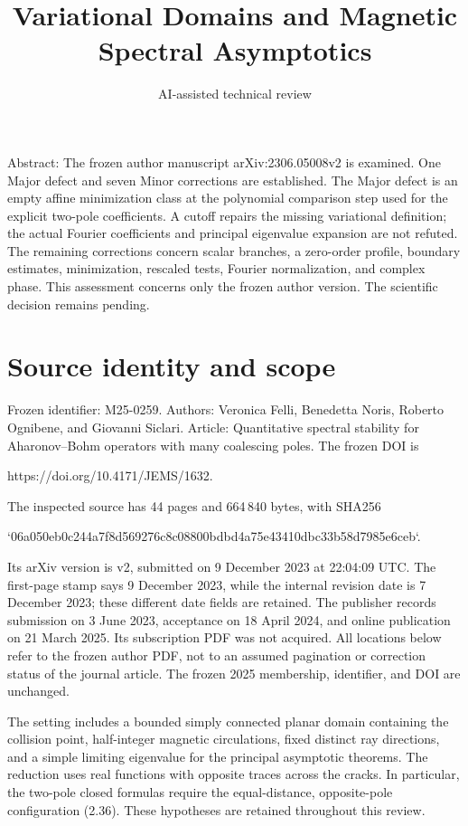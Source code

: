 \documentclass[10pt]{article}
\title{Variational Domains and Magnetic Spectral Asymptotics}
\author{AI-assisted technical review}
\date{}
\begin{document}
\maketitle
Abstract: The frozen author manuscript arXiv:2306.05008v2 is examined. One Major defect and seven Minor corrections are established. The Major defect is an empty affine minimization class at the polynomial comparison step used for the explicit two-pole coefficients. A cutoff repairs the missing variational definition; the actual Fourier coefficients and principal eigenvalue expansion are not refuted. The remaining corrections concern scalar branches, a zero-order profile, boundary estimates, minimization, rescaled tests, Fourier normalization, and complex phase. This assessment concerns only the frozen author version. The scientific decision remains pending.\par
\section*{Source identity and scope}
Frozen identifier: M25-0259. Authors: Veronica Felli, Benedetta Noris, Roberto Ognibene, and Giovanni Siclari. Article: Quantitative spectral stability for Aharonov–Bohm operators with many coalescing poles. The frozen DOI is\par
https://doi.org/10.4171/JEMS/1632.\par
The inspected source has 44 pages and 664 840 bytes, with SHA256\par
`06a050eb0c244a7f8d569276c8c08800bdbd4a75e43410dbc33b58d7985e6ceb`.\par
Its arXiv version is v2, submitted on 9 December 2023 at 22:04:09 UTC. The first-page stamp says 9 December 2023, while the internal revision date is 7 December 2023; these different date fields are retained. The publisher records submission on 3 June 2023, acceptance on 18 April 2024, and online publication on 21 March 2025. Its subscription PDF was not acquired. All locations below refer to the frozen author PDF, not to an assumed pagination or correction status of the journal article. The frozen 2025 membership, identifier, and DOI are unchanged.\par
The setting includes a bounded simply connected planar domain containing the collision point, half-integer magnetic circulations, fixed distinct ray directions, and a simple limiting eigenvalue for the principal asymptotic theorems. The reduction uses real functions with opposite traces across the cracks. In particular, the two-pole closed formulas require the equal-distance, opposite-pole configuration (2.36). These hypotheses are retained throughout this review.\par
\end{document}
